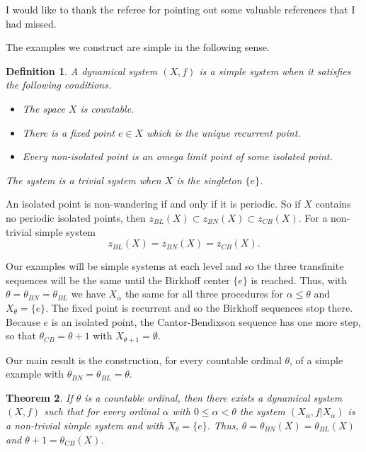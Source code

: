 \documentclass[12pt]{amsart}
\newtheorem{theo}{{\bfseries Theorem}}[section]
\newtheorem{df}[theo]{{\bfseries Definition}}
\def \a {\alpha }
\def \th {\theta}
\numberwithin{equation}{section}
\begin{document}
I would like to thank the referee for pointing out some valuable references that I had missed.

The examples we construct are simple in the following sense.\vspace{.25cm}

\begin{df}\label{def0.01} A dynamical system $(X,f)$ is a \emph{simple system} when it satisfies the following conditions.
\begin{itemize}
\item The space $X$ is countable.
\item There is a fixed point $e \in X$ which is the unique recurrent point.
\item Every non-isolated point is an omega limit point of some isolated point.
\end{itemize}

The system is a \emph{trivial system} when $X$ is the singleton $\{ e \}$. \end{df} \vspace{.25cm}



An isolated point is non-wandering if and only
if it is periodic. So if $X$ contains no periodic isolated points, then $z_{BL}(X) \subset z_{BN}(X) \subset z_{CB}(X)$. For a non-trivial
simple system
\begin{equation}\label{eq0.02}
z_{BL}(X) = z_{BN}(X) = z_{CB}(X).
\end{equation}

Our examples will be simple systems at each level and so the three transfinite
sequences will be the same until the Birkhoff center $\{ e \}$ is reached.  Thus, with $\th = \th_{BN} = \th_{BL}$ we have $X_{\a}$
the same for all three procedures for $\a \le \th$  and $X_{\th} = \{ e \}$. The fixed point is recurrent and so the Birkhoff sequences stop there.
Because $e$ is an isolated point, the Cantor-Bendixson sequence has one more step, so that $\th_{CB} = \th + 1$ with $X_{\th + 1} = \emptyset$.

Our main result is the construction, for every countable ordinal $\th$, of a simple example with $\th_{BN} = \th_{BL} = \th$.\vspace{.25cm}

\begin{theo}\label{theo0.02} If $\th$ is a countable ordinal, then there exists a dynamical system $(X,f)$ such that
for every ordinal $\a$ with $0 \le \a < \th$ the system $(X_{\a},f|X_{\a})$ is a non-trivial simple system and  with $X_{\th} = \{ e \}$. Thus,
$\th = \th_{BN}(X) = \th_{BL}(X)$ and $\th + 1 =  \th_{CB}(X).$\end{theo}\vspace{.5cm}
\end{document}

